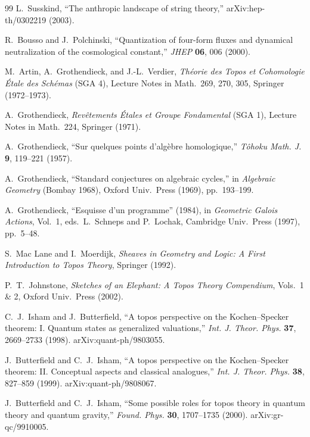 \documentclass[12pt,a4paper]{ltjsarticle}
\theoremstyle{definition}
\begin{document}
\begin{thebibliography}{99}
L.~Susskind, ``The anthropic landscape of string theory,'' arXiv:hep-th/0302219 (2003).

R.~Bousso and J.~Polchinski, ``Quantization of four-form fluxes and dynamical neutralization of the cosmological constant,'' \textit{JHEP} \textbf{06}, 006 (2000).

M.~Artin, A.~Grothendieck, and J.-L.~Verdier, \textit{Th\'{e}orie des Topos et Cohomologie \'{E}tale des Sch\'{e}mas} (SGA 4), Lecture Notes in Math.~269, 270, 305, Springer (1972--1973).

A.~Grothendieck, \textit{Rev\^{e}tements \'{E}tales et Groupe Fondamental} (SGA 1), Lecture Notes in Math.~224, Springer (1971).

A.~Grothendieck, ``Sur quelques points d'alg\`{e}bre homologique,'' \textit{T\^{o}hoku Math. J.} \textbf{9}, 119--221 (1957).

A.~Grothendieck, ``Standard conjectures on algebraic cycles,'' in \textit{Algebraic Geometry} (Bombay 1968), Oxford Univ.~Press (1969), pp.~193--199.

A.~Grothendieck, ``Esquisse d'un programme'' (1984), in \textit{Geometric Galois Actions}, Vol.~1, eds.~L.~Schneps and P.~Lochak, Cambridge Univ.~Press (1997), pp.~5--48.

S.~Mac Lane and I.~Moerdijk, \textit{Sheaves in Geometry and Logic: A First Introduction to Topos Theory}, Springer (1992).

P.~T.~Johnstone, \textit{Sketches of an Elephant: A Topos Theory Compendium}, Vols.~1 \& 2, Oxford Univ.~Press (2002).

C.~J.~Isham and J.~Butterfield, ``A topos perspective on the Kochen--Specker theorem: I. Quantum states as generalized valuations,'' \textit{Int. J. Theor. Phys.} \textbf{37}, 2669--2733 (1998). arXiv:quant-ph/9803055.

J.~Butterfield and C.~J.~Isham, ``A topos perspective on the Kochen--Specker theorem: II. Conceptual aspects and classical analogues,'' \textit{Int. J. Theor. Phys.} \textbf{38}, 827--859 (1999). arXiv:quant-ph/9808067.

J.~Butterfield and C.~J.~Isham, ``Some possible roles for topos theory in quantum theory and quantum gravity,'' \textit{Found. Phys.} \textbf{30}, 1707--1735 (2000). arXiv:gr-qc/9910005.


\end{thebibliography}
\end{document}
